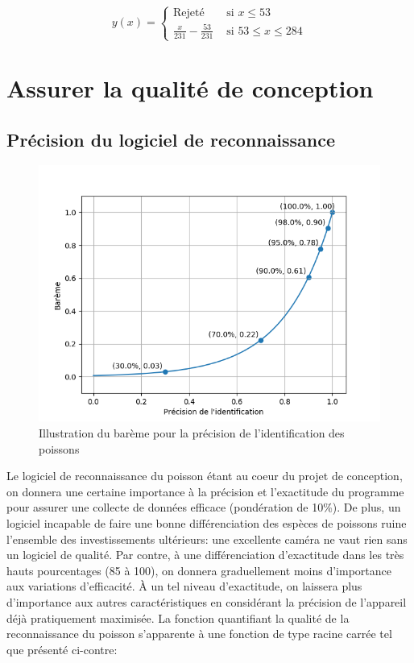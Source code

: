 \begin{equation}
    y(x) = \begin{cases}
        \text{Rejeté} & \text{ si } x \le 53 \\
        \frac{x}{231} - \frac{53}{231} & \text{ si } 53 \leq x \leq 284
    \end{cases}
    \label{eq:bareme_acheminement_infos}
\end{equation}

\section{Assurer la qualité de conception}

\subsection{Précision du logiciel de reconnaissance}

\begin{figure}
    \centering
    \includegraphics[width=\linewidth]{fig/bareme_ident.png}
    \caption{Illustration du barème pour la précision de l'identification des poissons}
    \label{fig:bareme_precision}
\end{figure}

Le logiciel de reconnaissance du poisson étant au coeur du projet de conception, on donnera une certaine importance à la précision et l'exactitude du programme pour assurer une collecte de données efficace (pondération de 10\%). De plus, un logiciel incapable de faire une bonne différenciation des espèces de poissons ruine l'ensemble des investissements ultérieurs: une excellente caméra ne vaut rien sans un logiciel de qualité. Par contre, à une différenciation d'exactitude dans les très hauts pourcentages (85 à 100), on donnera graduellement moins d'importance aux variations d'efficacité. À un tel niveau d'exactitude, on laissera plus d'importance aux autres caractéristiques en considérant la précision de l'appareil déjà pratiquement maximisée. La fonction quantifiant la qualité de la reconnaissance du poisson s'apparente à une fonction de type racine carrée tel que présenté ci-contre:

